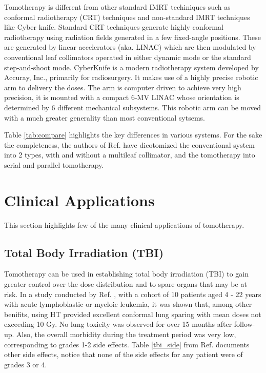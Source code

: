 \documentclass[10pt,journal,compsoc]{IEEEtran} %
\begin{document}
  Tomotherapy is different from other standard IMRT techiniques such as 
  conformal radiotherapy (CRT) techniques and non-standard IMRT techniques like 
  Cyber knife.   Standard CRT techniques generate highly conformal radiotherapy 
  using radiation fields generated in a few fixed-angle positions. These are 
  generated by linear accelerators (aka. LINAC) which are then modulated by 
  conventional leaf collimators operated in either dynamic mode or the standard 
  step-and-shoot mode. CyberKnife is a modern radiotherapy system developed by 
  Accuray, Inc., primarily for radiosurgery. It makes use of a highly precise 
  robotic arm to delivery the doses. The arm is computer driven to achieve very 
  high precision, it is mounted with a compact 6-MV LINAC whose orientation is 
  determined by 6 different mechanical subsystems. This robotic arm can be 
  moved with a much greater generality than most conventional sytsems. 
  
  Table \ref{tab:compare} highlights the key differences in various systems. 
  For the 
  sake the completeness, the authors of Ref. \cite{Fenwick2006} have 
  dicotomized the conventional system into 2 types, with and without a 
  multileaf collimator, and the tomotherapy into serial and parallel 
  tomotherapy.
  \section{Clinical Applications}
  \label{clinical}
  This section highlights few of the many clinical applications of tomotherapy. 
  \subsection{Total Body Irradiation (TBI)}
  Tomotherapy can be used in establishing total body irradiation (TBI) to gain 
  greater control over the dose distribution and to spare organs that may be at 
  risk. In a study conducted by Ref. \cite{Gruen2013}, with a cohort of 10 
  patients aged 4 - 22 years with acute lymphoblastic or myeloic leukemia, it 
  was shown that, among other benifits, using HT provided excellent 
  conformal lung sparing with mean doses not exceeding 10 Gy. No lung toxicity 
  was observed for over 15 months after follow-up. Also, the overall 
  morbidity   during the treatment period was very low, corresponding to grades 
  1-2 side   effects. Table \ref{tbi_side} from Ref. \cite{Gruen2013} documents 
  other side  effects, notice that none of the side effects for any patient 
  were of grades 3 or 
  4. 
  
\end{document}
